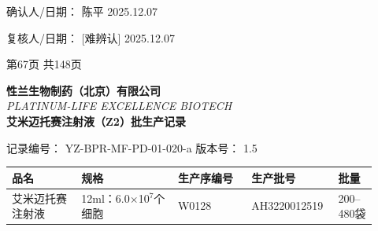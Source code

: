 \documentclass[UTF8,10pt,a4paper,fontset=fandol]{ctexart}
\newcommand{\fieldvalue}[1]{#1}
\newcommand{\handwritten}[1]{#1}
\begin{document}
\medskip

确认人/日期：
\fieldvalue{\handwritten{陈平}}\quad
\fieldvalue{\handwritten{2025.12.07}}

\hfill

复核人/日期：
\fieldvalue{\handwritten{[难辨认]}}\quad
\fieldvalue{\handwritten{2025.12.07}}

\medskip

\begin{center}
第67页 共148页
\end{center}

\newpage

\noindent
\begin{center}
\textbf{性兰生物制药（北京）有限公司}\\
\textit{PLATINUM-LIFE EXCELLENCE BIOTECH}\\[2pt]
\textbf{艾米迈托赛注射液（Z2）批生产记录}
\end{center}

\noindent
记录编号：
\fieldvalue{YZ-BPR-MF-PD-01-020-a}
\hfill
版本号：
\fieldvalue{1.5}

\medskip

\begin{tabular}{|p{0.18\linewidth}|p{0.25\linewidth}|p{0.19\linewidth}|p{0.20\linewidth}|p{0.10\linewidth}|}
\hline
品名 & 规格 & 生产序编号 & 生产批号 & 批量\\
\hline
\fieldvalue{艾米迈托赛注射液}
&
\fieldvalue{12ml：6.0$\times$10$^{7}$个细胞}
&
\fieldvalue{\handwritten{W0128}}
&
\fieldvalue{\handwritten{AH3220012519}}
&
\fieldvalue{200--480袋}\\
\hline
\end{tabular}

\medskip
\end{document}
